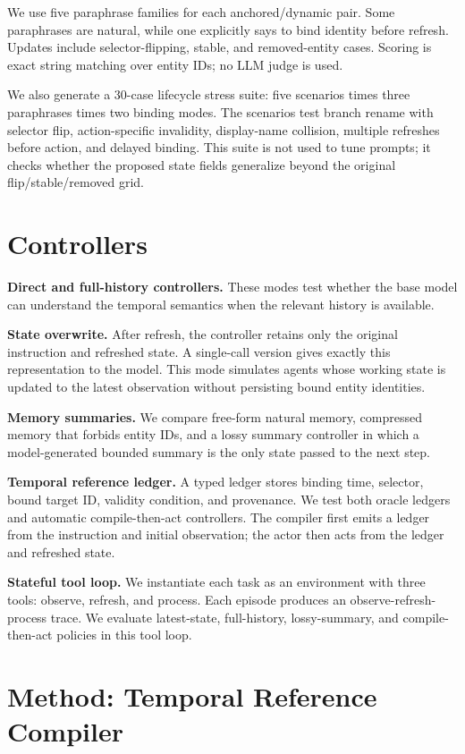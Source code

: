 \documentclass[letterpaper]{article}
\begin{document}
We use five paraphrase families for each anchored/dynamic pair. Some paraphrases are natural, while one explicitly says to bind identity before refresh. Updates include selector-flipping, stable, and removed-entity cases. Scoring is exact string matching over entity IDs; no LLM judge is used.

We also generate a 30-case lifecycle stress suite: five scenarios times three paraphrases times two binding modes. The scenarios test branch rename with selector flip, action-specific invalidity, display-name collision, multiple refreshes before action, and delayed binding. This suite is not used to tune prompts; it checks whether the proposed state fields generalize beyond the original flip/stable/removed grid.

\section{Controllers}

\textbf{Direct and full-history controllers.} These modes test whether the base model can understand the temporal semantics when the relevant history is available.

\textbf{State overwrite.} After refresh, the controller retains only the original instruction and refreshed state. A single-call version gives exactly this representation to the model. This mode simulates agents whose working state is updated to the latest observation without persisting bound entity identities.

\textbf{Memory summaries.} We compare free-form natural memory, compressed memory that forbids entity IDs, and a lossy summary controller in which a model-generated bounded summary is the only state passed to the next step.

\textbf{Temporal reference ledger.} A typed ledger stores binding time, selector, bound target ID, validity condition, and provenance. We test both oracle ledgers and automatic compile-then-act controllers. The compiler first emits a ledger from the instruction and initial observation; the actor then acts from the ledger and refreshed state.

\textbf{Stateful tool loop.} We instantiate each task as an environment with three tools: observe, refresh, and process. Each episode produces an observe-refresh-process trace. We evaluate latest-state, full-history, lossy-summary, and compile-then-act policies in this tool loop.

\section{Method: Temporal Reference Compiler}
\end{document}

